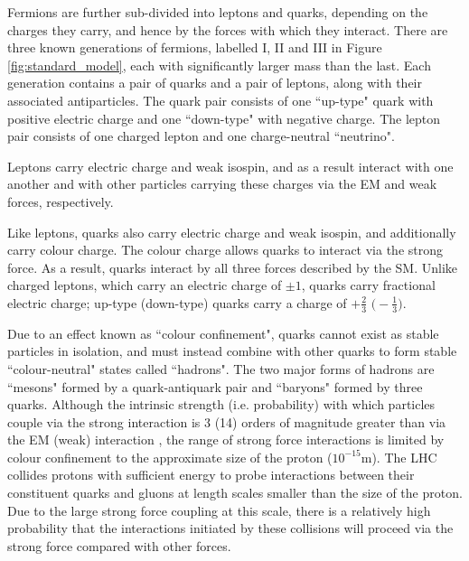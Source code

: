 Fermions are further sub-divided into leptons and quarks, depending on the charges they carry, and hence by the forces with which they interact. There are three known generations of fermions, labelled I, II and III in Figure \ref{fig:standard_model}, each with significantly larger mass than the last. Each generation contains a pair of quarks and a pair of leptons, along with their associated antiparticles. The quark pair consists of one ``up-type" quark with positive electric charge and one ``down-type" with negative charge. The lepton pair consists of one charged lepton and one charge-neutral ``neutrino". 

Leptons carry electric charge and weak isospin, and as a result interact with one another and with other particles carrying these charges via the EM and weak forces, respectively.  

Like leptons, quarks also carry electric charge and weak isospin, and additionally carry colour charge. The colour charge allows quarks to interact via the strong force. As a result, quarks interact by all three forces described by the SM. Unlike charged leptons, which carry an electric charge of \(\pm1\), quarks carry fractional electric charge; up-type (down-type) quarks carry a charge of \(+\frac{2}{3}\) \(\big(-\frac{1}{3}\big)\).

Due to an effect known as ``colour confinement", quarks cannot exist as stable particles in isolation, and must instead combine with other quarks to form stable ``colour-neutral" states called ``hadrons". The two major forms of hadrons are ``mesons" formed by a quark-antiquark pair and ``baryons" formed by three quarks. Although the intrinsic strength (i.e. probability) with which particles couple via the strong interaction is 3 (14) orders of magnitude greater than via the EM (weak) interaction \cite{griffiths_2008}, the range of strong force interactions is limited by colour confinement to the approximate size of the proton (\(10^{-15}\)m). The LHC collides protons with sufficient energy to probe interactions between their constituent quarks and gluons at length scales smaller than the size of the proton. Due to the large strong force coupling at this scale, there is a relatively high probability that the interactions initiated by these collisions will proceed via the strong force compared with other forces. 

